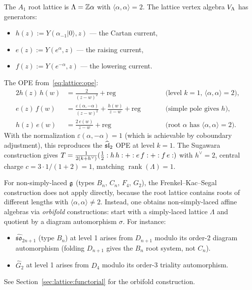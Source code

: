 \begin{example}
\label{ex:lattice:sl2-fks}
The $A_1$ root lattice is $\Lambda = \mathbb{Z}\alpha$ with
$\langle\alpha,\alpha\rangle = 2$.
The lattice vertex algebra $V_\Lambda$ has generators:
\begin{itemize}
\item $h(z) := Y(\alpha_{-1}|0\rangle, z)$ --- the Cartan current,
\item $e(z) := Y(e^\alpha, z)$ --- the raising current,
\item $f(z) := Y(e^{-\alpha}, z)$ --- the lowering current.
\end{itemize}
The OPE from~\eqref{eq:lattice:ope}:
\begin{alignat*}{2}
h(z)\,h(w) &= \frac{2}{(z-w)^2} + \text{reg}
  &\qquad &\text{(level $k = 1$, $\langle\alpha,\alpha\rangle = 2$)}, \\
e(z)\,f(w)
&= \frac{\varepsilon(\alpha,-\alpha)}{(z-w)^2}
  + \frac{h(w)}{z-w} + \text{reg}
  &\qquad &\text{(simple pole gives $h$)}, \\
h(z)\,e(w) &= \frac{2\,e(w)}{z-w} + \text{reg}
  &\qquad &\text{(root $\alpha$ has $\langle\alpha,\alpha\rangle=2$)}.
\end{alignat*}
With the normalization $\varepsilon(\alpha,-\alpha) = 1$ (which is
achievable by coboundary adjustment), this reproduces the $\widehat{\mathfrak{sl}}_2$
OPE at level $k=1$. The Sugawara construction gives
$T = \frac{1}{2(k+h^\vee)}(\frac{1}{2}:{h\,h}: +
:{e\,f}: + :{f\,e}:)$
with $h^\vee = 2$, central charge $c = 3 \cdot 1/(1+2) = 1$,
matching $\operatorname{rank}(\Lambda) = 1$.
\end{example}

\begin{remark}\label{rem:lattice:non-simply-laced}
For non-simply-laced $\mathfrak{g}$ (types $B_n$, $C_n$, $F_4$, $G_2$),
the Frenkel--Kac--Segal construction does not apply directly, because
the root lattice contains roots of different lengths with
$\langle\alpha,\alpha\rangle \neq 2$. Instead, one obtains
non-simply-laced affine algebras via \emph{orbifold} constructions:
start with a simply-laced lattice $\Lambda$ and quotient by a
diagram automorphism $\sigma$. For instance:
\begin{itemize}
\item $\widehat{\mathfrak{so}}_{2n+1}$ (type $B_n$) at level 1 arises from $D_{n+1}$ modulo its
  order-2 diagram automorphism (folding $D_{n+1}$ gives the $B_n$ root system, not $C_n$).
\item $\widehat{G}_2$ at level 1 arises from $D_4$ modulo its order-3
  triality automorphism.
\end{itemize}
See Section~\ref{sec:lattice:functorial} for the orbifold construction.
\end{remark}



